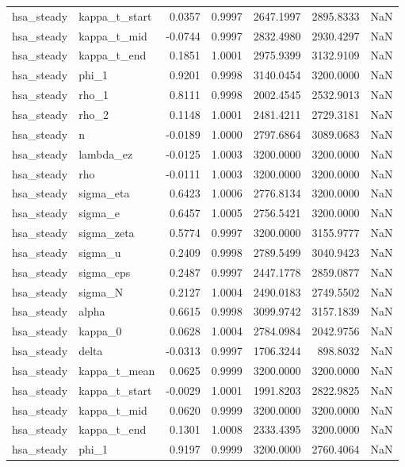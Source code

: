 \begin{tabular}{llrrrrl}
hsa\_steady & kappa\_t\_start & 0.0357 & 0.9997 & 2647.1997 & 2895.8333 & NaN \\
hsa\_steady & kappa\_t\_mid & -0.0744 & 0.9997 & 2832.4980 & 2930.4297 & NaN \\
hsa\_steady & kappa\_t\_end & 0.1851 & 1.0001 & 2975.9399 & 3132.9109 & NaN \\
hsa\_steady & phi\_1 & 0.9201 & 0.9998 & 3140.0454 & 3200.0000 & NaN \\
hsa\_steady & rho\_1 & 0.8111 & 0.9998 & 2002.4545 & 2532.9013 & NaN \\
hsa\_steady & rho\_2 & 0.1148 & 1.0001 & 2481.4211 & 2729.3181 & NaN \\
hsa\_steady & n & -0.0189 & 1.0000 & 2797.6864 & 3089.0683 & NaN \\
hsa\_steady & lambda\_ez & -0.0125 & 1.0003 & 3200.0000 & 3200.0000 & NaN \\
hsa\_steady & rho & -0.0111 & 1.0003 & 3200.0000 & 3200.0000 & NaN \\
hsa\_steady & sigma\_eta & 0.6423 & 1.0006 & 2776.8134 & 3200.0000 & NaN \\
hsa\_steady & sigma\_e & 0.6457 & 1.0005 & 2756.5421 & 3200.0000 & NaN \\
hsa\_steady & sigma\_zeta & 0.5774 & 0.9997 & 3200.0000 & 3155.9777 & NaN \\
hsa\_steady & sigma\_u & 0.2409 & 0.9998 & 2789.5499 & 3040.9423 & NaN \\
hsa\_steady & sigma\_eps & 0.2487 & 0.9997 & 2447.1778 & 2859.0877 & NaN \\
hsa\_steady & sigma\_N & 0.2127 & 1.0004 & 2490.0183 & 2749.5502 & NaN \\
hsa\_steady & alpha & 0.6615 & 0.9998 & 3099.9742 & 3157.1839 & NaN \\
hsa\_steady & kappa\_0 & 0.0628 & 1.0004 & 2784.0984 & 2042.9756 & NaN \\
hsa\_steady & delta & -0.0313 & 0.9997 & 1706.3244 & 898.8032 & NaN \\
hsa\_steady & kappa\_t\_mean & 0.0625 & 0.9999 & 3200.0000 & 3200.0000 & NaN \\
hsa\_steady & kappa\_t\_start & -0.0029 & 1.0001 & 1991.8203 & 2822.9825 & NaN \\
hsa\_steady & kappa\_t\_mid & 0.0620 & 0.9999 & 3200.0000 & 3200.0000 & NaN \\
hsa\_steady & kappa\_t\_end & 0.1301 & 1.0008 & 2333.4395 & 3200.0000 & NaN \\
hsa\_steady & phi\_1 & 0.9197 & 0.9999 & 3200.0000 & 2760.4064 & NaN \\

\end{tabular}
